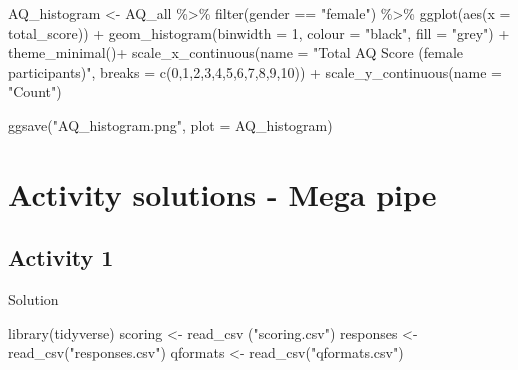\documentclass[
  oneside]{book}
\newenvironment{Shaded}{\begin{snugshade}}{\end{snugshade}}
\newcommand{\AttributeTok}[1]{\textcolor[rgb]{0.77,0.63,0.00}{#1}}
\newcommand{\DecValTok}[1]{\textcolor[rgb]{0.00,0.00,0.81}{#1}}
\newcommand{\FunctionTok}[1]{\textcolor[rgb]{0.00,0.00,0.00}{#1}}
\newcommand{\NormalTok}[1]{#1}
\newcommand{\OtherTok}[1]{\textcolor[rgb]{0.56,0.35,0.01}{#1}}
\newcommand{\SpecialCharTok}[1]{\textcolor[rgb]{0.00,0.00,0.00}{#1}}
\newcommand{\StringTok}[1]{\textcolor[rgb]{0.31,0.60,0.02}{#1}}
\begin{document}
\begin{Shaded}
\begin{Highlighting}[]
\NormalTok{AQ\_histogram }\OtherTok{\textless{}{-}}\NormalTok{ AQ\_all }\SpecialCharTok{\%\textgreater{}\%}
  \FunctionTok{filter}\NormalTok{(gender }\SpecialCharTok{==} \StringTok{"female"}\NormalTok{) }\SpecialCharTok{\%\textgreater{}\%}
  \FunctionTok{ggplot}\NormalTok{(}\FunctionTok{aes}\NormalTok{(}\AttributeTok{x =}\NormalTok{ total\_score)) }\SpecialCharTok{+}
  \FunctionTok{geom\_histogram}\NormalTok{(}\AttributeTok{binwidth =} \DecValTok{1}\NormalTok{, }\AttributeTok{colour =} \StringTok{"black"}\NormalTok{, }\AttributeTok{fill =} \StringTok{"grey"}\NormalTok{) }\SpecialCharTok{+}
  \FunctionTok{theme\_minimal}\NormalTok{()}\SpecialCharTok{+}
  \FunctionTok{scale\_x\_continuous}\NormalTok{(}\AttributeTok{name =} \StringTok{"Total AQ Score (female participants)"}\NormalTok{, }\AttributeTok{breaks =} \FunctionTok{c}\NormalTok{(}\DecValTok{0}\NormalTok{,}\DecValTok{1}\NormalTok{,}\DecValTok{2}\NormalTok{,}\DecValTok{3}\NormalTok{,}\DecValTok{4}\NormalTok{,}\DecValTok{5}\NormalTok{,}\DecValTok{6}\NormalTok{,}\DecValTok{7}\NormalTok{,}\DecValTok{8}\NormalTok{,}\DecValTok{9}\NormalTok{,}\DecValTok{10}\NormalTok{)) }\SpecialCharTok{+}
  \FunctionTok{scale\_y\_continuous}\NormalTok{(}\AttributeTok{name =} \StringTok{"Count"}\NormalTok{)}

\FunctionTok{ggsave}\NormalTok{(}\StringTok{"AQ\_histogram.png"}\NormalTok{, }\AttributeTok{plot =}\NormalTok{ AQ\_histogram)}
\end{Highlighting}
\end{Shaded}

\hypertarget{activity-solutions---mega-pipe}{%
\section{Activity solutions - Mega pipe}\label{activity-solutions---mega-pipe}}

\hypertarget{activity-1-4}{%
\subsection{Activity 1}\label{activity-1-4}}

Solution

\begin{Shaded}
\begin{Highlighting}[]
\FunctionTok{library}\NormalTok{(tidyverse)}
\NormalTok{scoring }\OtherTok{\textless{}{-}} \FunctionTok{read\_csv}\NormalTok{ (}\StringTok{"scoring.csv"}\NormalTok{)}
\NormalTok{responses }\OtherTok{\textless{}{-}} \FunctionTok{read\_csv}\NormalTok{(}\StringTok{"responses.csv"}\NormalTok{)}
\NormalTok{qformats }\OtherTok{\textless{}{-}} \FunctionTok{read\_csv}\NormalTok{(}\StringTok{"qformats.csv"}\NormalTok{)}
\end{Highlighting}
\end{Shaded}
\end{document}
